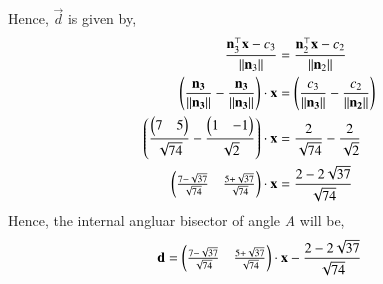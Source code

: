\documentclass[journal,12pt,twocolumn]{IEEEtran}
\theoremstyle{remark}
\begin{document}
	Hence, $\vec{d}$ is given by,\\
	\begin{align*}
		\frac{\mathbf{n}_{3}^{\top} \mathbf{x}-c_{3}}{\left\lVert\mathbf{n}_{3}\right\rVert}&=\frac{\mathbf{n}_{2}^{\top} \mathbf{x}-c_{2}}{\left\lVert\mathbf{n}_{2}\right\rVert}\\
		\left(\frac{\mathbf{n_{3}}}{\left\lVert\mathbf{n_{3}}\right\rVert}-\frac{\mathbf{n_{3}}}{\left\lVert\mathbf{n_{3}}\right\rVert}\right)\cdot \mathbf{x}&=\left(\frac{c_{3}}{\left\lVert\mathbf{n_{3}}\right\rVert}-\frac{c_{2}}{\left\lVert\mathbf{n_{2}}\right\rVert}\right)\\
		\left(\frac{\begin{pmatrix}7&5\end{pmatrix}}{\sqrt{74}}-\frac{\begin{pmatrix}1&-1\end{pmatrix}}{\sqrt{2}}\right)\cdot \mathbf{x}&=\frac{2}{\sqrt{74}}-\frac{2}{\sqrt{2}}\\
		\begin{pmatrix}\frac{7-\sqrt{37}}{\sqrt{74}}&\frac{5+\sqrt{37}}{\sqrt{74}}\end{pmatrix}\cdot \mathbf{x}&=\frac{2-2\sqrt{37}}{\sqrt{74}}
	\end{align*}
	Hence, the internal angluar bisector of angle \textit{A} will be,\\
	\begin{align*}
		\mathbf{d}=\begin{pmatrix}\frac{7-\sqrt{37}}{\sqrt{74}}&\frac{5+\sqrt{37}}{\sqrt{74}}\end{pmatrix}\cdot \mathbf{x}-\frac{2-2\sqrt{37}}{\sqrt{74}}
	\end{align*}
\end{document}
